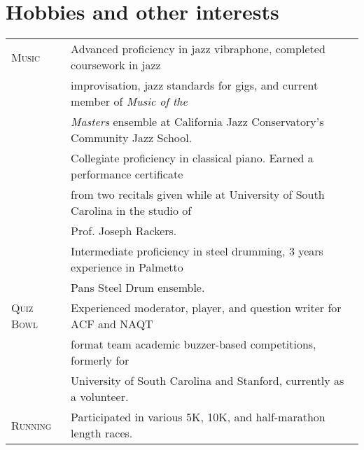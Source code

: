 \documentclass[a4paper,10pt]{article}
\begin{document}
\section{Hobbies and other interests}
\begin{tabular}{ll}
 \textsc{Music} & Advanced proficiency in jazz vibraphone, completed coursework in jazz \\
 & improvisation, jazz standards for gigs, and current member of \textit{Music of the} \\
 & \textit{Masters} ensemble at California Jazz Conservatory's Community Jazz School.\vspace{0.05in}\\
 & Collegiate proficiency in classical piano.  Earned a performance certificate\\
 & from two recitals given while at University of South Carolina in the studio of\\
 & Prof. Joseph Rackers.\vspace{0.05in}\\
 & Intermediate proficiency in steel drumming, 3 years experience in Palmetto \\
 & Pans Steel Drum ensemble. \vspace{0.05in}\\
  \textsc{Quiz Bowl} & Experienced moderator, player, and question writer for ACF and NAQT \\
 & format team academic buzzer-based competitions, formerly for \\
 & University of South Carolina and Stanford, currently as a volunteer. \vspace{0.05in} \\
\textsc{Running} & Participated in various 5K, 10K, and half-marathon length races.
\end{tabular}
\nocite{*}
\end{document}
